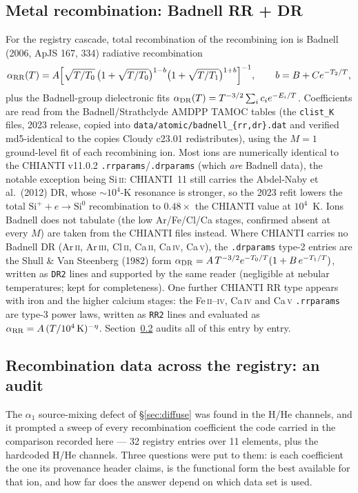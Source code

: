 \documentclass[english,a4paper]{my_memo}
\newcommand{\code}[1]{\texttt{#1}}
\begin{document}
\subsection{Metal recombination: Badnell RR + DR}
For the registry cascade, total recombination of the recombining ion is
Badnell (2006, ApJS 167, 334) radiative recombination
\begin{equation}
  \alpha_{\rm RR}(T) = A\Big[\sqrt{T/T_0}\,
  \big(1+\sqrt{T/T_0}\big)^{1-b}\big(1+\sqrt{T/T_1}\big)^{1+b}\Big]^{-1},
  \qquad b = B + C e^{-T_2/T},
  \label{eq:badnellrr}
\end{equation}
plus the Badnell-group dielectronic fits
$\alpha_{\rm DR}(T) = T^{-3/2}\sum_i c_i e^{-E_i/T}$.
Coefficients are read from the Badnell/Strathclyde AMDPP TAMOC tables
(the \code{clist\_K} files, 2023 release, copied into
\code{data/atomic/badnell\_\{rr,dr\}.dat} and verified md5-identical to
the copies Cloudy c23.01 redistributes), using the $M{=}1$ ground-level
fit of each recombining ion.  Most ions are numerically identical to the
CHIANTI v11.0.2 \code{.rrparams}/\code{.drparams} (which \emph{are}
Badnell data), the notable exception being Si\,\textsc{ii}:
CHIANTI~11 still carries the Abdel-Naby et al.\ (2012) DR, whose
$\sim$$10^4$-K resonance is stronger, so the 2023 refit lowers the
total $\mathrm{Si}^+ + e \to \mathrm{Si}^0$ recombination to $0.48\times$
the CHIANTI value at $10^4$~K.  Ions Badnell does not tabulate (the low
Ar/Fe/Cl/Ca stages, confirmed absent at every $M$) are taken from the
CHIANTI files instead.
Where CHIANTI carries no Badnell DR (Ar\,\textsc{ii}, Ar\,\textsc{iii},
Cl\,\textsc{ii}, Ca\,\textsc{ii}, Ca\,\textsc{iv}, Ca\,\textsc{v}), the
\code{.drparams} type-2 entries are the Shull \&
Van Steenberg (1982) form
$\alpha_{\rm DR} = A\,T^{-3/2} e^{-T_0/T}(1 + B\,e^{-T_1/T})$, written
as \code{DR2} lines and supported by the same reader (negligible at
nebular temperatures; kept for completeness).  One further CHIANTI RR
type appears with iron and the higher calcium stages: the
Fe\,\textsc{ii}--\textsc{iv}, Ca\,\textsc{iv} and Ca\,\textsc{v}
\code{.rrparams} are type-3 power laws, written as \code{RR2} lines and
evaluated as $\alpha_{\rm RR} = A\,(T/10^4\,{\rm K})^{-\eta}$.
Section~\ref{sec:recaudit} audits all of this entry by entry.

\subsection{Recombination data across the registry: an audit}
\label{sec:recaudit}
The $\alpha_1$ source-mixing defect of \S\ref{sec:diffuse} was found in the
H/He channels, and it prompted a sweep of every recombination coefficient the
code carried in the comparison recorded here --- 32 registry entries over 11 elements, plus the hardcoded H/He
channels.  Three questions were put to them: is each coefficient the one its
provenance header claims, is the functional form the best available for that
ion, and how far does the answer depend on which data set is used.
\end{document}
